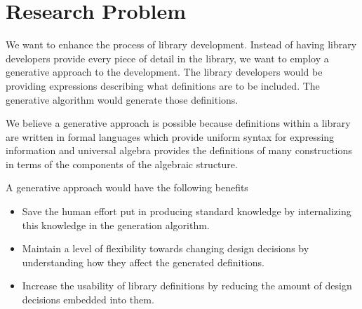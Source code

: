 \section{Research Problem}
\label{sec:questions}


We want to enhance the process of library development. Instead of having library developers provide every piece of detail in the library, we want to employ a generative approach to the development. The library developers would be providing expressions describing what definitions are to be included. The generative algorithm would generate those definitions. 

We believe a generative approach is possible because definitions within a library are written in formal languages which provide uniform syntax for expressing information and universal algebra provides the definitions of many constructions in terms of the components of the algebraic structure. 

 A generative approach would have the following benefits 
\begin{itemize}
    \item Save the human effort put in producing standard knowledge by internalizing this knowledge in the generation algorithm.
    \item Maintain a level of flexibility towards changing design decisions by understanding how they affect the generated definitions.
    \item Increase the usability of library definitions by reducing the amount of design decisions embedded into them. 
\end{itemize}  


